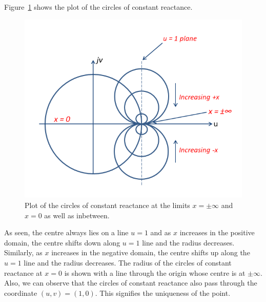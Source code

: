 Figure~\ref{fig:uytrdbn} shows the plot of the circles of constant reactance.
\begin{figure}[h]
\centering
\includegraphics[width=1\linewidth]{./graphics/plot_of_const_reactance_circles}
\caption{Plot of the circles of constant reactance at the limits $x = \pm\infty$ and $x = 0$ as well as inbetween.}
\label{fig:uytrdbn}
\end{figure}

As seen, the centre always lies on a line $u = 1$ and as $x$ increases in the positive domain, the centre shifts down along $u = 1$ line and the radius decreases. Similarly, as $x$ increases in the negative domain, the centre shifts up along the $u = 1$ line and the radius decreases. The radius of the circles of constant reactance at $x = 0$ is shown with a line through the origin whose centre is at $\pm\infty$. Also, we can observe that the circles of constant reactance also pass through the coordinate $(u,v) = (1,0)$. This signifies the uniqueness of the point. 

